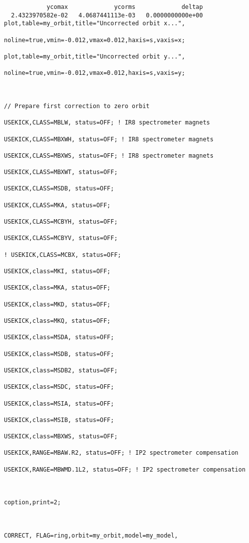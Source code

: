 \begin{verbatim}
            ycomax             ycorms             deltap 
  2.4323970582e-02   4.0687441113e-03   0.0000000000e+00 
plot,table=my_orbit,title="Uncorrected orbit x...",

noline=true,vmin=-0.012,vmax=0.012,haxis=s,vaxis=x;

plot,table=my_orbit,title="Uncorrected orbit y...",

noline=true,vmin=-0.012,vmax=0.012,haxis=s,vaxis=y;



// Prepare first correction to zero orbit

USEKICK,CLASS=MBLW, status=OFF; ! IR8 spectrometer magnets

USEKICK,CLASS=MBXWH, status=OFF; ! IR8 spectrometer magnets

USEKICK,CLASS=MBXWS, status=OFF; ! IR8 spectrometer magnets

USEKICK,CLASS=MBXWT, status=OFF;

USEKICK,CLASS=MSDB, status=OFF; 

USEKICK,CLASS=MKA, status=OFF; 

USEKICK,CLASS=MCBYH, status=OFF; 

USEKICK,CLASS=MCBYV, status=OFF; 

! USEKICK,CLASS=MCBX, status=OFF; 

USEKICK,class=MKI, status=OFF;

USEKICK,class=MKA, status=OFF;

USEKICK,class=MKD, status=OFF;

USEKICK,class=MKQ, status=OFF;

USEKICK,class=MSDA, status=OFF;

USEKICK,class=MSDB, status=OFF;

USEKICK,class=MSDB2, status=OFF;

USEKICK,class=MSDC, status=OFF;

USEKICK,class=MSIA, status=OFF;

USEKICK,class=MSIB, status=OFF;

USEKICK,class=MBXWS, status=OFF;

USEKICK,RANGE=MBAW.R2, status=OFF; ! IP2 spectrometer compensation

USEKICK,RANGE=MBWMD.1L2, status=OFF; ! IP2 spectrometer compensation



coption,print=2;



CORRECT, FLAG=ring,orbit=my_orbit,model=my_model,


\end{verbatim}
